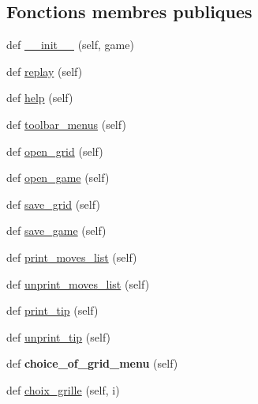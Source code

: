 \subsection*{Fonctions membres publiques}
\begin{DoxyCompactItemize}
\item 
def \hyperlink{classGUIController_1_1MainWindow_a69da336cfb18e8a8fac9b337e970586b}{\+\_\+\+\_\+init\+\_\+\+\_\+} (self, game)
\item 
def \hyperlink{classGUIController_1_1MainWindow_a60a31538c9b32fc3b1c9aff8bb659e11}{replay} (self)
\item 
def \hyperlink{classGUIController_1_1MainWindow_a3533d40daad91929865344350ea5ecb2}{help} (self)
\item 
def \hyperlink{classGUIController_1_1MainWindow_a483d135e809887f19c4aa90eed85f05e}{toolbar\+\_\+menus} (self)
\item 
def \hyperlink{classGUIController_1_1MainWindow_a56fcc62051b5bba985227d7d2e53dd16}{open\+\_\+grid} (self)
\item 
def \hyperlink{classGUIController_1_1MainWindow_a0c52a408d518ea18f37a47caff1bc655}{open\+\_\+game} (self)
\item 
def \hyperlink{classGUIController_1_1MainWindow_a2fc4a4cfac14aadcfb0a4d7287b6988c}{save\+\_\+grid} (self)
\item 
def \hyperlink{classGUIController_1_1MainWindow_af6b4f741a83067f0fc0e93bbdfef7782}{save\+\_\+game} (self)
\item 
def \hyperlink{classGUIController_1_1MainWindow_a6e850a914b0681184beb236d63d4597f}{print\+\_\+moves\+\_\+list} (self)
\item 
def \hyperlink{classGUIController_1_1MainWindow_a4de267c46dbd5902cbade13eabe50f24}{unprint\+\_\+moves\+\_\+list} (self)
\item 
def \hyperlink{classGUIController_1_1MainWindow_a9801fb2a06f3308baaaf617b91245d0d}{print\+\_\+tip} (self)
\item 
def \hyperlink{classGUIController_1_1MainWindow_a60df967a8de9a0897e327d65518d8fc6}{unprint\+\_\+tip} (self)
\item 
\mbox{\label{classGUIController_1_1MainWindow_aa3741a7c8215e9e675cc58c9149eb56e}} 
def {\bfseries choice\+\_\+of\+\_\+grid\+\_\+menu} (self)
\item 
def \hyperlink{classGUIController_1_1MainWindow_acccf4f385ead7d587dfa5d201899ee2a}{choix\+\_\+grille} (self, i)
\item 

\end{DoxyCompactItemize}
